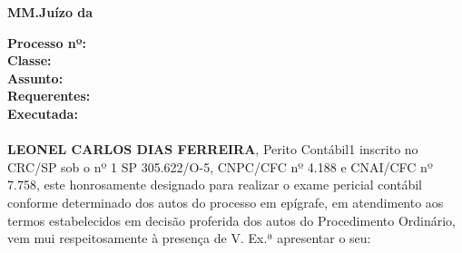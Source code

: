 \textbf{MM.Juízo da \comarca}



\textbf{Processo nº:} \processo \\
\textbf{Classe:} \classe \\
\textbf{Assunto:} \assunto \\
\textbf{Requerentes:} \requerente \\
\textbf{Executada:} \requerida \\
            \\
            
\textbf{LEONEL CARLOS DIAS FERREIRA}, Perito Contábil1 inscrito no CRC/SP sob o nº 1 SP 305.622/O-5, CNPC/CFC nº 4.188 e CNAI/CFC nº 7.758, este honrosamente designado para realizar o exame pericial contábil conforme determinado \nomfls dos autos do processo em epígrafe, em atendimento aos termos estabelecidos em decisão proferida \nomorigfls dos autos do Procedimento Ordinário, vem mui respeitosamente à presença de V. Ex.ª apresentar o seu:
